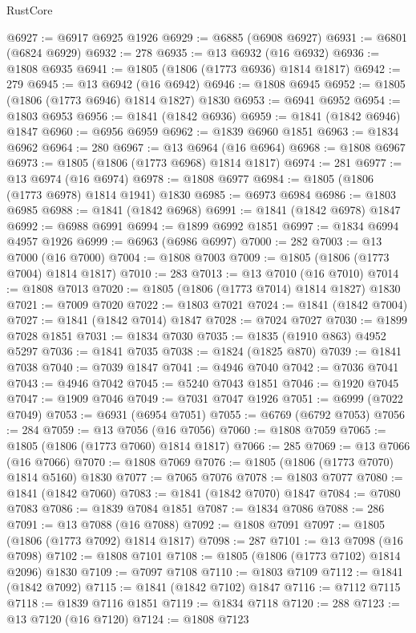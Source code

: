 \begin{lexlean}{RustCore}
\begin{coremodule}
@6927 := @6917 @6925 @1926
@6929 := @6885 (@6908 @6927)
@6931 := @6801 (@6824 @6929)
@6932 := 278
@6935 := @13 @6932 (@16 @6932)
@6936 := @1808 @6935
@6941 := @1805 (@1806 (@1773 @6936) @1814 @1817)
@6942 := 279
@6945 := @13 @6942 (@16 @6942)
@6946 := @1808 @6945
@6952 := @1805 (@1806 (@1773 @6946) @1814 @1827) @1830
@6953 := @6941 @6952
@6954 := @1803 @6953
@6956 := @1841 (@1842 @6936)
@6959 := @1841 (@1842 @6946) @1847
@6960 := @6956 @6959
@6962 := @1839 @6960 @1851
@6963 := @1834 @6962
@6964 := 280
@6967 := @13 @6964 (@16 @6964)
@6968 := @1808 @6967
@6973 := @1805 (@1806 (@1773 @6968) @1814 @1817)
@6974 := 281
@6977 := @13 @6974 (@16 @6974)
@6978 := @1808 @6977
@6984 := @1805 (@1806 (@1773 @6978) @1814 @1941) @1830
@6985 := @6973 @6984
@6986 := @1803 @6985
@6988 := @1841 (@1842 @6968)
@6991 := @1841 (@1842 @6978) @1847
@6992 := @6988 @6991
@6994 := @1899 @6992 @1851
@6997 := @1834 @6994 @4957 @1926
@6999 := @6963 (@6986 @6997)
@7000 := 282
@7003 := @13 @7000 (@16 @7000)
@7004 := @1808 @7003
@7009 := @1805 (@1806 (@1773 @7004) @1814 @1817)
@7010 := 283
@7013 := @13 @7010 (@16 @7010)
@7014 := @1808 @7013
@7020 := @1805 (@1806 (@1773 @7014) @1814 @1827) @1830
@7021 := @7009 @7020
@7022 := @1803 @7021
@7024 := @1841 (@1842 @7004)
@7027 := @1841 (@1842 @7014) @1847
@7028 := @7024 @7027
@7030 := @1899 @7028 @1851
@7031 := @1834 @7030
@7035 := @1835 (@1910 @863) @4952 @5297
@7036 := @1841 @7035
@7038 := @1824 (@1825 @870)
@7039 := @1841 @7038
@7040 := @7039 @1847
@7041 := @4946 @7040
@7042 := @7036 @7041
@7043 := @4946 @7042
@7045 := @5240 @7043 @1851
@7046 := @1920 @7045
@7047 := @1909 @7046
@7049 := @7031 @7047 @1926
@7051 := @6999 (@7022 @7049)
@7053 := @6931 (@6954 @7051)
@7055 := @6769 (@6792 @7053)
@7056 := 284
@7059 := @13 @7056 (@16 @7056)
@7060 := @1808 @7059
@7065 := @1805 (@1806 (@1773 @7060) @1814 @1817)
@7066 := 285
@7069 := @13 @7066 (@16 @7066)
@7070 := @1808 @7069
@7076 := @1805 (@1806 (@1773 @7070) @1814 @5160) @1830
@7077 := @7065 @7076
@7078 := @1803 @7077
@7080 := @1841 (@1842 @7060)
@7083 := @1841 (@1842 @7070) @1847
@7084 := @7080 @7083
@7086 := @1839 @7084 @1851
@7087 := @1834 @7086
@7088 := 286
@7091 := @13 @7088 (@16 @7088)
@7092 := @1808 @7091
@7097 := @1805 (@1806 (@1773 @7092) @1814 @1817)
@7098 := 287
@7101 := @13 @7098 (@16 @7098)
@7102 := @1808 @7101
@7108 := @1805 (@1806 (@1773 @7102) @1814 @2096) @1830
@7109 := @7097 @7108
@7110 := @1803 @7109
@7112 := @1841 (@1842 @7092)
@7115 := @1841 (@1842 @7102) @1847
@7116 := @7112 @7115
@7118 := @1839 @7116 @1851
@7119 := @1834 @7118
@7120 := 288
@7123 := @13 @7120 (@16 @7120)
@7124 := @1808 @7123

\end{coremodule}
\end{lexlean}
